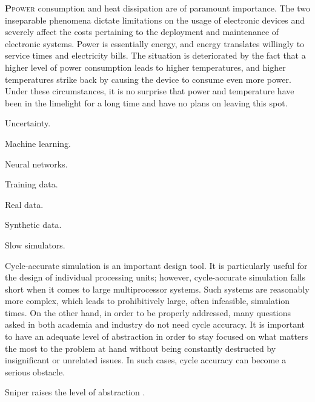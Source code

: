 \lettrine[findent=0.4em, nindent=0em]{\textbf{P}}{power} consumption and heat
dissipation are of paramount importance. The two inseparable phenomena dictate
limitations on the usage of electronic devices and severely affect the costs
pertaining to the deployment and maintenance of electronic systems. Power is
essentially energy, and energy translates willingly to service times and
electricity bills. The situation is deteriorated by the fact that a higher level
of power consumption leads to higher temperatures, and higher temperatures
strike back by causing the device to consume even more power. Under these
circumstances, it is no surprise that power and temperature have been in the
limelight for a long time and have no plans on leaving this spot.

\cite{park2015}

Uncertainty.

Machine learning.

Neural networks.

Training data.

Real data.

Synthetic data.

Slow simulators.

Cycle-accurate simulation is an important design tool. It is particularly useful
for the design of individual processing units; however, cycle-accurate
simulation falls short when it comes to large multiprocessor systems. Such
systems are reasonably more complex, which leads to prohibitively large, often
infeasible, simulation times. On the other hand, in order to be properly
addressed, many questions asked in both academia and industry do not need cycle
accuracy. It is important to have an adequate level of abstraction in order to
stay focused on what matters the most to the problem at hand without being
constantly destructed by insignificant or unrelated issues. In such cases, cycle
accuracy can become a serious obstacle.

Sniper raises the level of abstraction \cite{carlson2011}.
